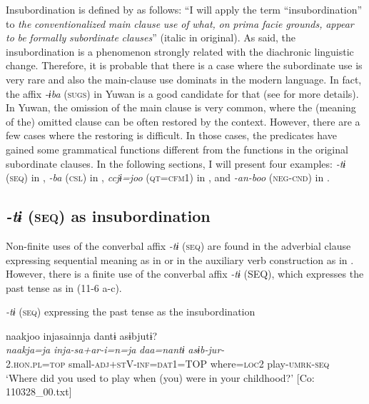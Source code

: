 Insubordination is defined by \citet[367]{Evans2007} as follows: “I will apply the term “insubordination” to \textit{the} \textit{conventionalized} \textit{main} \textit{clause} \textit{use} \textit{of} \textit{what,} \textit{on} \textit{prima} \textit{facie} \textit{grounds,} \textit{appear} \textit{to} \textit{be} \textit{formally} \textit{subordinate} \textit{clauses}” (italic in original). As \citet[367]{Evans2007} said, the insubordination is a phenomenon strongly related with the diachronic linguistic change. Therefore, it is probable that there is a case where the subordinate use is very rare and also the main-clause use dominats in the modern language. In fact, the affix \textit{{}-ɨba} (\textsc{sugs}) in Yuwan is a good candidate for that (see  for more details). In Yuwan, the omission of the main clause is very common, where the (meaning of the) omitted clause can be often restored by the context. However, there are a few cases where the restoring is difficult. In those cases, the predicates have gained some grammatical functions different from the functions in the original subordinate clauses. In the following sections, I will present four examples: \textit{-tɨ} (\textsc{seq}) in , \textit{{}-ba} (\textsc{csl}) in , \textit{ccjɨ=joo} (\textsc{qt}=\textsc{cfm}1) in , and \textit{{}-an-boo} (\textsc{neg}-\textsc{cnd}) in .

\subsection{\textit{{}-tɨ} (\textsc{seq}) as insubordination}\label{sec:11.2.1}

Non-finite uses of the converbal affix \textit{-tɨ} (\textsc{seq}) are found in the adverbial clause expressing sequential meaning as in  or in the auxiliary verb construction as in . However, there is a finite use of the converbal affix \textit{-tɨ} (SEQ), which expresses the past tense as in (11-6 a-c).

\ea\label{ex:11-6}  \textit{{}-tɨ} (\textsc{seq}) expressing the past tense as the insubordination

  \ea  
      \glll    naakjoo  injasainnja  dantɨ  asɨbjutɨ?\\    
      \textit{naakja=ja}  \textit{inja-sa+ar-i=n=ja}  \textit{daa=nantɨ} \textit{asɨb-jur-}\\   
      2.\textsc{hon}.\textsc{pl}=\textsc{top}  small-\textsc{adj}+\textsc{st}V-\textsc{inf}=\textsc{dat}1=TOP  where=\textsc{loc}2   play-\textsc{umrk}-\textsc{seq}\\
      \glt ‘Where did you used to play when (you) were in your childhood?’       [Co: 110328\_00.txt]

